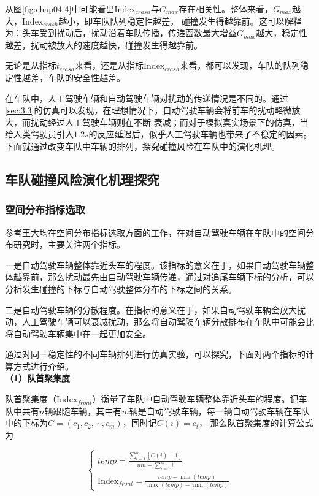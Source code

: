 从图\ref{fig:chap04-4}中可能看出$\mathrm{Index}_{crash}$与$G_{max}$存在相关性。整体来看，$G_{max}$越大，$\mathrm{Index}_{crash}$越小，即车队队列稳定性越差，
碰撞发生得越靠前。这可以解释为：头车受到扰动后，扰动沿着车队传播，传递函数最大增益$G_{max}$越大，稳定性越差，扰动被放大的速度越快，碰撞发生得越靠前。

无论是从指标$t_{crash}$来看，还是从指标$\mathrm{Index}_{crash}$来看，都可以发现，车队的队列稳定性越差，车队的安全性越差。

在车队中，人工驾驶车辆和自动驾驶车辆对扰动的传递情况是不同的。通过\ref{sec:3.3}的仿真可以发现，在理想情况下，自动驾驶车辆会将前车的扰动略微放大，而扰动经过人工驾驶车辆则在不断
衰减；而对于模拟真实场景下的仿真，当给人类驾驶员引入$1.2s$的反应延迟后，似乎人工驾驶车辆也带来了不稳定的因素。下面就通过改变车队中车辆的排列，探究碰撞风险在车队中的演化机理。

\subsection{车队碰撞风险演化机理探究}
\label{sec:4.2.4}

\subsubsection{空间分布指标选取}
\label{sec:4.2.4.1}

参考王大均在空间分布指标选取方面的工作\cite{wang2021auto}，在对自动驾驶车辆在车队中的空间分布研究时，主要关注两个指标。

一是自动驾驶车辆整体靠近头车的程度。该指标的意义在于，如果自动驾驶车辆整体越靠前，那么扰动最先由自动驾驶车辆传递，通过对追尾车辆下标的分析，可以分析发生碰撞的下标与自动驾驶整体分布的下标之间的关系。

二是自动驾驶车辆的分散程度。在指标的意义在于，如果自动驾驶车辆会放大扰动，人工驾驶车辆可以衰减扰动，那么将自动驾驶车辆分散排布在车队中可能会比将自动驾驶车辆集中在一起更加安全。

通过对同一稳定性的不同车辆排列进行仿真实验，可以探究，下面对两个指标的计算方式进行介绍。 \\

\noindent \textbf{（1）队首聚集度}

队首聚集度（$\mathrm{Index}_{front}$）衡量了车队中自动驾驶车辆整体靠近头车的程度。记车队中共有$n$辆跟随车辆，其中有$m$辆是自动驾驶车辆，每一辆自动驾驶车辆在车队中的下标为$C = (c_1, c_2, \cdots, c_m)$，同时记$C(i) = c_i$，
那么队首聚集度的计算公式为

\begin{equation}
    \begin{cases}
      temp = \frac{\sum_{i=1}^{m}[C(i) - 1 ]}{nm - \sum_{i=1}^{m}i} \\
      \mathrm{Index}_{front} = \frac{temp - \min(temp)}{\max(temp) - \min(temp)}
    \end{cases}
    \label{eq:chap04-2}
\end{equation}

